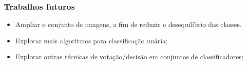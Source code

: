 \documentclass[t]{beamer}
\begin{document}
\begin{frame}[c]
	\frametitle{Trabalhos futuros}

	\begin{itemize}
		\item Ampliar o conjunto de imagens, a fim de reduzir o desequilíbrio das classes.
		\item Explorar mais algoritmos para classificação unária;
		\item Explorar outras técnicas de votação/decisão em conjuntos de classificadores;
	\end{itemize}
\end{frame}



%	
%	
\end{document}
